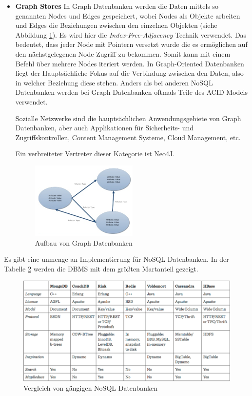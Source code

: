 \begin{itemize}
	\clearpage

	\item \textbf{Graph Stores\newline}
	In Graph Datenbanken werden die Daten mittels so genannten Nodes und Edges gespeichert, wobei Nodes als Objekte arbeiten und Edges die Beziehungen zwischen den einzelnen Objekten (siehe Abbildung \ref{fig:graphdb}). Es wird hier die \textit{Index-Free-Adjacency} Technik verwendet. Das bedeutet, dass jeder Node mit Pointern versetzt wurde die es ermöglichen auf den nächstgelegenen Node Zugriff zu bekommen. Somit kann mit einem Befehl über mehrere Nodes iteriert werden. In Graph-Oriented Datenbanken liegt der Hauptsächliche Fokus auf die Verbindung zwischen den Daten, also in welcher Beziehung diese stehen. Anders als bei anderen NoSQL Datenbanken werden bei Graph Datenbanken oftmals Teile des ACID Models verwendet.

	Sozialle Netzwerke sind die hauptsächlichen Anwendungsgebiete von Graph Datenbanken, aber auch Applikationen für Sicherheits- und Zugriffskontrollen, Content Management Systeme, Cloud Management, etc. 

	Ein verbreiteter Vertreter dieser Kategorie ist Neo4J.

	\begin{figure}[h]\centering
		\includegraphics[width=0.5\textwidth]{images/graphStore}
		\caption{Aufbau von Graph Datenbanken}
		\label{fig:graphdb}
	\end{figure}
\end{itemize}
\clearpage

Es gibt eine unmenge an Implementierung für NoSQL-Datenbanken. In der Tabelle \ref{fig:nosqlcomp} werden die DBMS mit dem größten Martanteil gezeigt.

\begin{figure}[!htb]\centering
	\includegraphics[width=1\textwidth]{images/noSQLComp}
	\caption{Vergleich von gängigen NoSQL Datenbanken \cite{MELD.CH2-dbms.compNoSQL}}
	\label{fig:nosqlcomp}
\end{figure}


\clearpage %